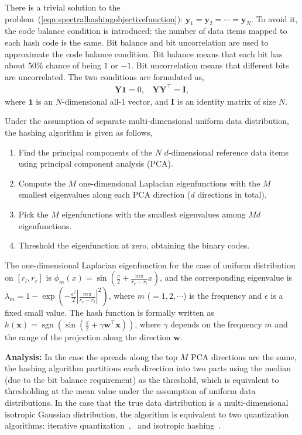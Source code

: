 \documentclass[10pt,journal,compsoc]{IEEEtran}
\begin{document}
There is a trivial solution to the problem~(\ref{eqn:spectralhashingobjectivefunction}):
$\mathbf{y}_1 = \mathbf{y}_2 = \cdots = \mathbf{y}_N$.
To avoid it,
the code balance condition is introduced:
the number of data items mapped to each hash code is the same.
Bit balance and bit uncorrelation are used
to approximate the code balance condition.
Bit balance means that
each bit has about $50\%$ chance of being $1$ or $-1$.
Bit uncorrelation means that different bits are uncorrelated.
The two conditions are formulated as,
\begin{align}
\mathbf{Y}\mathbf{1} = 0,~~~~
\mathbf{Y} \mathbf{Y}^\top = \mathbf{I},
\end{align}
where $\mathbf{1}$ is an $N$-dimensional all-$1$ vector,
and $\mathbf{I}$ is an identity matrix of size $N$.

Under the assumption of separate multi-dimensional uniform data distribution,
the hashing algorithm is given as follows,
\begin{enumerate}
	\item Find the principal components of the $N$ $d$-dimensional reference data items using principal component analysis (PCA).
	\item Compute the $M$ one-dimensional Laplacian eigenfunctions with the $M$ smallest eigenvalues
	along each PCA direction ($d$ directions in total).
	\item Pick the $M$ eigenfunctions with the smallest eigenvalues among $Md$ eigenfunctions.
	\item Threshold the eigenfunction at zero, obtaining the binary codes.
\end{enumerate}

The one-dimensional Laplacian eigenfunction for
the case of uniform distribution on $[r_l, r_r]$
is $\phi_m(x) = \sin(\frac{\pi}{2} + \frac{m\pi}{r_r - r_l}x)$,
and the corresponding eigenvalue is
$\lambda_m = 1 - \exp{(-\frac{\epsilon^2}{2} |\frac{m\pi}{r_r - r_l}|^2)}$,
where $m$ ($= 1, 2, \cdots$) is the frequency
and $\epsilon$ is a fixed small value.
The hash function is formally written as
$h(\mathbf{x}) = \operatorname{sgn}(\sin(\frac{\pi}{2} + \gamma \mathbf{w}^\top\mathbf{x}))$,
where $\gamma$ depends on the frequency $m$
and the range of the projection along the direction $\mathbf{w}$.

\textbf{Analysis:}
In the case the spreads along the top $M$ PCA directions are the same,
the hashing algorithm
partitions each direction into two parts
using the median (due to the bit balance requirement) as the threshold,
which is equivalent to thresholding at the mean value
under the assumption of
uniform data distributions.
In the case that the true data distribution is a multi-dimensional isotropic Gaussian distribution,
the algorithm is equivalent to
two quantization algorithms:
iterative quantization~\cite{GongLGP13},~\cite{GongL11} and isotropic hashing~\cite{KongL12a}.
\end{document}
